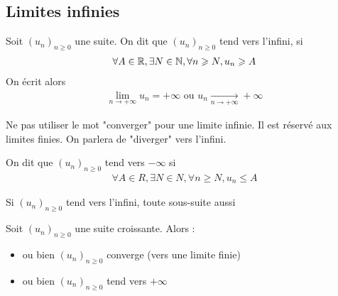 \subsection{Limites infinies}
\begin{graybox}
    \begin{definition}
    Soit $(u_n)_{n \geq 0}$ une suite. On dit que $(u_n)_{n \geq 0}$ tend vers l'infini, si 
    \begin{align*}
    \forall A \in \mathbb{R}, \exists N \in \mathbb{N}, \forall n \geqslant N, u_n \geqslant A
    \end{align*}
    On écrit alors 
    \begin{align*}
    \lim_{n \to +\infty} u_n = +\infty \text{ ou } u_n \xrightarrow[n \to +\infty]{} +\infty
    \end{align*}
\end{definition}
\end{graybox}

\begin{remarque}
    Ne pas utiliser le mot "converger" pour une limite infinie. Il est réservé aux limites finies. On parlera de "diverger" vers l'infini.
\end{remarque}

\begin{graybox}
    \begin{definition}
    On dit que $(u_n)_{n \geq 0}$ tend vers $-\infty$ si 
    \begin{align*}
        \forall A \in R, \exists N \in N, \forall n \geq N, u_n \leq A
    \end{align*}
\end{definition}
\end{graybox}

\begin{remarque}
 Si $(u_n)_{n \geq 0}$ tend vers l'infini, toute sous-suite aussi   
\end{remarque}

\begin{theoreme}
    Soit $(u_n)_{n \geq 0}$ une suite croissante. Alors :
    \begin{itemize}
        \item ou bien $(u_n)_{n \geq 0}$ converge (vers une limite finie)
        \item ou bien $(u_n)_{n \geq 0}$ tend vers $+\infty$
    \end{itemize}
\end{theoreme}

